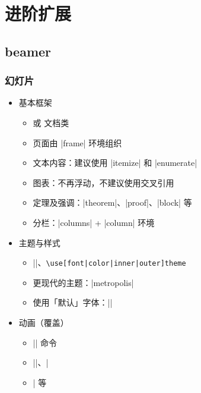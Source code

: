 \section{进阶扩展}
\subsection{beamer}
\begin{frame}[fragile]
  \frametitle{幻灯片}
  \begin{itemize}
    \item<+-> 基本框架
  
      \begin{itemize}
        \item {} 或  文档类
        \item 页面由 |frame| 环境组织
        \item 文本内容：建议使用 |itemize| 和 |enumerate|
        \item 图表：不再浮动，不建议使用交叉引用
        \item 定理及强调：|theorem|、|proof|、|block| 等
        \item 分栏：|columns| + |column| 环境
      \end{itemize}
  
    \item<+-> 主题与样式
  
      \begin{itemize}
        \item |\usetheme|、\lstinline[style=style@inline]+\use[font|color|inner|outer]theme+
        \item 更现代的主题：|metropolis|
        \item 使用「默认」字体：||
      \end{itemize}
  
    \item<+-> 动画（覆盖）
  
      \begin{itemize}
        \item |\pause| 命令
        \item ||、|\item<1->| 等
      \end{itemize}
  \end{itemize}
\end{frame}
  
  

